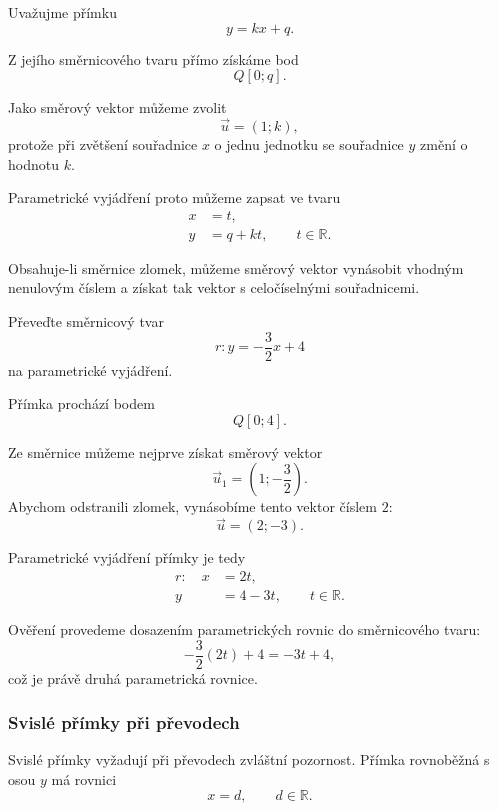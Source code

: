 Uvažujme přímku
\[
    y=kx+q.
\]

Z jejího směrnicového tvaru přímo získáme bod
\[
    Q[0;q].
\]

Jako směrový vektor můžeme zvolit
\[
    \vec{u}=(1;k),
\]
protože při zvětšení souřadnice $x$ o jednu jednotku se souřadnice
$y$ změní o hodnotu $k$.

Parametrické vyjádření proto můžeme zapsat ve tvaru
\begin{equation}\label{eq:Conversion_slope_to_parametric}
    \begin{aligned}
        x&=t,\\
        y&=q+kt,
        \qquad t\in\mathbb{R}.
    \end{aligned}
\end{equation}

Obsahuje-li směrnice zlomek, můžeme směrový vektor vynásobit vhodným
nenulovým číslem a získat tak vektor s celočíselnými souřadnicemi.

\begin{example}\label{exa:Conversion_slope_to_parametric}
    Převeďte směrnicový tvar
    \[
        r:y=-\frac{3}{2}x+4
    \]
    na parametrické vyjádření.

    Přímka prochází bodem
    \[
        Q[0;4].
    \]

    Ze směrnice můžeme nejprve získat směrový vektor
    \[
        \vec{u}_1=\left(1;-\frac{3}{2}\right).
    \]
    Abychom odstranili zlomek, vynásobíme tento vektor číslem $2$:
    \[
        \vec{u}=(2;-3).
    \]

    Parametrické vyjádření přímky je tedy
    \[
        \begin{aligned}
            r:\quad x&=2t,\\
                     y&=4-3t,
                     \qquad t\in\mathbb{R}.
        \end{aligned}
    \]

    Ověření provedeme dosazením parametrických rovnic do směrnicového
    tvaru:
    \[
        -\frac{3}{2}(2t)+4=-3t+4,
    \]
    což je právě druhá parametrická rovnice.
\end{example}


\subsubsection{Svislé přímky při převodech}
\label{subsubsec:Vertical_lines_conversions}

Svislé přímky vyžadují při převodech zvláštní pozornost. Přímka
rovnoběžná s osou $y$ má rovnici
\begin{equation}\label{eq:Vertical_line_equation_conversion}
    x=d,
    \qquad d\in\mathbb{R}.
\end{equation}

